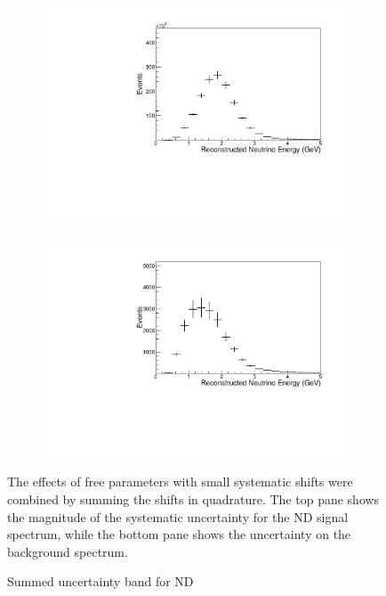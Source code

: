 {\begin{figure}
\end{figure}


\begin{figure}
\begin{center}
\begin{subfigure}[c]{0.7\textwidth}
\includegraphics[width=\textwidth]{figures/systs/params/nd_sig_genie_sum_errors.pdf}
\end{subfigure}

\begin{subfigure}[c]{0.7\textwidth}
\includegraphics[width=\textwidth]{figures/systs/params/nd_bkg_genie_sum_errors.pdf}
\end{subfigure}
\end{center}
\caption{Summed \genie uncertainty band for ND}{
The effects of free parameters with small systematic shifts were
combined by summing the shifts in quadrature.
The top pane shows the magnitude of the systematic uncertainty for the ND
signal spectrum, while the bottom pane shows the uncertainty on the
background spectrum.
}
\label{syst_param_sum_small_genie_nd}


\end{figure}}
